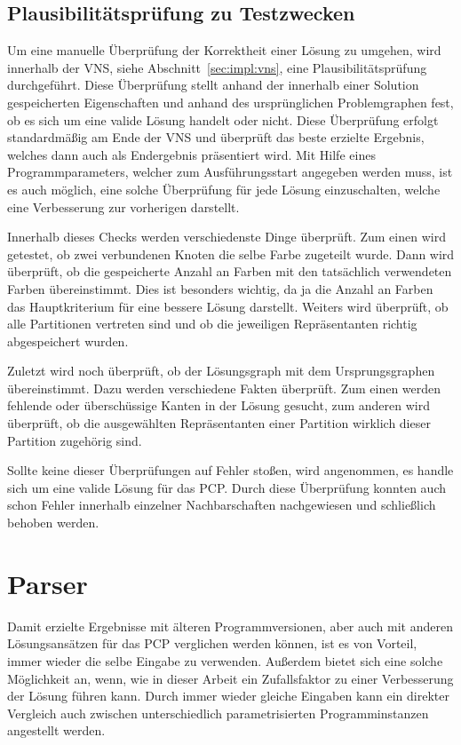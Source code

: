 \subsection{Plausibilitätsprüfung zu Testzwecken}
\label{sec:plausibility}
Um eine manuelle Überprüfung der Korrektheit einer Lösung zu umgehen, wird innerhalb der VNS, siehe Abschnitt~\ref{sec:impl:vns}, eine Plausibilitätsprüfung durchgeführt. Diese Überprüfung stellt anhand 
der innerhalb einer Solution gespeicherten Eigenschaften und anhand des ursprünglichen Problemgraphen fest, ob es sich um eine valide Lösung handelt oder nicht. Diese Überprüfung erfolgt standardmäßig
am Ende der VNS und überprüft das beste erzielte Ergebnis, welches dann auch als Endergebnis präsentiert wird. Mit Hilfe eines Programmparameters, welcher zum Ausführungsstart angegeben werden muss, ist es
auch möglich, eine solche Überprüfung für jede Lösung einzuschalten, welche eine Verbesserung zur vorherigen darstellt. 

Innerhalb dieses Checks werden verschiedenste Dinge überprüft. Zum einen wird getestet, ob zwei verbundenen Knoten die selbe Farbe zugeteilt wurde. Dann wird überprüft, ob die gespeicherte Anzahl an Farben
mit den tatsächlich verwendeten Farben übereinstimmt. Dies ist besonders wichtig, da ja die Anzahl an Farben das Hauptkriterium für eine bessere Lösung darstellt. Weiters wird überprüft, ob alle Partitionen
vertreten sind und ob die jeweiligen Repräsentanten richtig abgespeichert wurden. 

Zuletzt wird noch überprüft, ob der Lösungsgraph mit dem Ursprungsgraphen übereinstimmt. Dazu werden verschiedene Fakten überprüft. Zum einen werden fehlende oder überschüssige Kanten in der Lösung gesucht, 
zum anderen wird überprüft, ob die ausgewählten Repräsentanten einer Partition wirklich dieser Partition zugehörig sind. 

Sollte keine dieser Überprüfungen auf Fehler stoßen, wird angenommen, es handle sich um eine valide Lösung für das PCP\@. Durch diese Überprüfung konnten auch schon Fehler innerhalb einzelner Nachbarschaften 
nachgewiesen und schließlich behoben werden.


\section{Parser}
\label{sec:parser}

Damit erzielte Ergebnisse mit älteren Programmversionen, aber auch mit anderen Lösungs\-ansätzen für das PCP verglichen werden können, ist es von
Vorteil, immer wieder die selbe Eingabe zu verwenden. Außerdem bietet sich eine solche Möglichkeit an, wenn, wie in dieser Arbeit ein Zufallsfaktor
zu einer Verbesserung der Lösung führen kann. Durch immer wieder gleiche Eingaben kann ein direkter Vergleich auch zwischen unterschiedlich
parametrisierten Programminstanzen angestellt werden.

